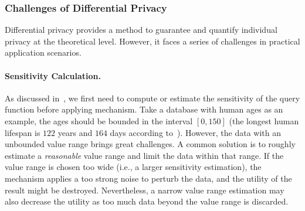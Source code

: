 



\subsubsection{Challenges of Differential Privacy}
\label{subsubsec:challengesOfDP}
Differential privacy provides a method to guarantee and quantify individual privacy at the theoretical level. However, it faces a series of challenges in practical application scenarios.

\paragraph{Sensitivity Calculation.}
As discussed in~\cite{subsubsec:DPMechanisms}, we first need to compute or estimate the sensitivity of the query function before applying \differentialprivacy mechanism. Take a database with human ages as an example, the ages should be bounded in the interval $\left[0,150\right] $ (the longest human lifespan is $122$ years and $164$ days according to~\cite{whitney_1997}). However, the data with an unbounded value range brings great challenges. A common solution is to roughly estimate a \textit{reasonable} value range and limit the data within that range. If the value range is chosen too wide (i.e., a larger sensitivity estimation), the \differentialprivacy mechanism applies a too strong noise to perturb the data, and the utility of the result might be destroyed. Nevertheless, a narrow value range estimation may also decrease the utility as too much data beyond the value range is discarded.

